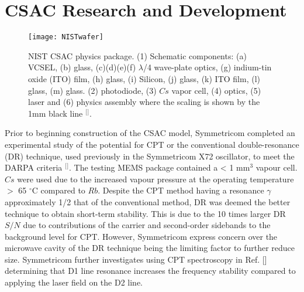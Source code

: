 \section{\label{sec:level1}CSAC Research and Development}



\begin{figure}[b]
\centering
\texttt{[image: NISTwafer]}
\caption{\label{fig:NISTwafer}NIST CSAC physics package. (1) Schematic components: (a) VCSEL, (b) glass, (c)(d)(e)(f) $\lambda$/4 wave-plate optics, (g) indium-tin oxide (ITO) film, (h) glass, (i) Silicon, (j) glass, (k) ITO film, (l) glass, (m) glass. (2) photodiode, (3) $Cs$ vapor cell, (4) optics, (5) laser and (6) physics assembly where the scaling is shown by the 1mm black line $^[$\citep{Knappe2004AClock}$^]$.}
\end{figure}


Prior to beginning construction of the CSAC model, Symmetricom completed an experimental study of the potential for CPT or the conventional double-resonance (DR) technique, used previously in the Symmetricom X72 oscillator,  to meet the DARPA criteria $^[$\citep{Lutwak2002TheInterrogation}$^]$. The testing MEMS package contained a < 1 mm$^3$ vapour cell. $Cs$ were used due to the increased vapour pressure at the operating temperature $>$ 65 $^{\circ }\textrm{C}$ compared to $Rb$. Despite the CPT method having a resonance $\gamma$ approximately 1/2 that of the conventional method, DR was deemed the better technique to obtain short-term stability. This is due to the 10 times larger DR $S/N$ due to contributions of the carrier and second-order sidebands to the background level for CPT. However, Symmetricom express concern over the microwave cavity of the DR technique being the limiting factor to further reduce size. Symmetricom further investigates using CPT spectroscopy in Ref. [] determining that D1 line resonance increases the frequency stability compared to applying the laser field on the D2 line. 

